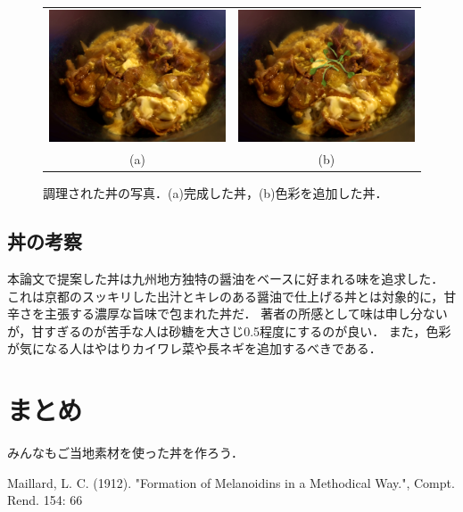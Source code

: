 \begin{figure}[ht]
\centering
\begin{tabular}[]{@{}cc@{}}

\includegraphics[width=8.00000cm]{./fig/don.jpg} &
\includegraphics[width=8.00000cm]{./fig/don_green.jpg}\\
(a) & (b)\\

\end{tabular}
\caption{調理された丼の写真．(a)完成した丼，(b)色彩を追加した丼．\label{fig:don}}
\end{figure}

\subsection{丼の考察}\label{ux4e3cux306eux8003ux5bdf}

本論文で提案した丼は九州地方独特の醤油をベースに好まれる味を追求した．
これは京都のスッキリした出汁とキレのある醤油で仕上げる丼とは対象的に，甘辛さを主張する濃厚な旨味で包まれた丼だ．
著者の所感として味は申し分ないが，甘すぎるのが苦手な人は砂糖を大さじ0.5程度にするのが良い．
また，色彩が気になる人はやはりカイワレ菜や長ネギを追加するべきである．

\section{まとめ}\label{ux307eux3068ux3081}

みんなもご当地素材を使った丼を作ろう．

\begin{thebibliography}{9}
 Maillard, L. C. (1912). "Formation of Melanoidins in a Methodical Way.", Compt. Rend. 154: 66
\end{thebibliography}

